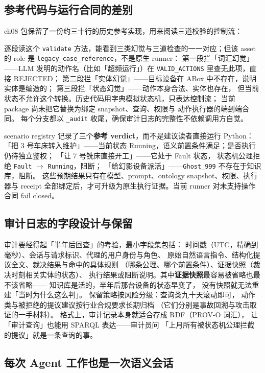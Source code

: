 \subsection{参考代码与运行合同的差别}

ch08 包保留了一份约三十行的历史参考实现，用来阅读三道校验的控制流：



逐段读这个 \texttt{validate} 方法，能看到三类幻觉与三道检查的一一对应；但该 asset
的 role 是 \texttt{legacy\_case\_reference}，不是原生 runner：
第一段拦「词汇幻觉」——LLM 发明的动作名（比如「超频运行」）在
\texttt{VALID\_ACTIONS} 里查无此项，直接 REJECTED；
第二段拦「实体幻觉」——目标设备在 ABox 中不存在，说明实体是编造的；
第三段拦「状态幻觉」——动作本身合法、实体也存在，
但当前状态不允许这个转换。历史代码用字典模拟状态机，只表达控制流；
当前 package 尚未把它替换为绑定 snapshot、查询、权限与
动作执行器的端到端合同。
每个分支都以 \texttt{\_audit} 收尾，确保审计日志的完整性不依赖调用方自觉。

scenario registry 记录了三个\textbf{参考 verdict}，而不是建议读者直接运行 Python：
「把 3 号车床转入维护」——当前状态 Running，语义前置条件满足；是否执行仍待独立鉴权；
「让 7 号铣床直接开工」——它处于 Fault 状态，
状态机公理拒绝 \texttt{Fault} \(\rightarrow\) \texttt{Running}，阻断；
「给幻影设备派活」——\texttt{Ghost\_999} 不存在于知识库，阻断。
这些预期结果只有在模型、prompt、ontology snapshot、权限、执行器与 receipt
全部绑定后，才可升级为原生执行证据。当前 runner 对未支持操作合同 fail closed。

\subsection{审计日志的字段设计与保留}

审计要经得起「半年后回查」的考验，最小字段集包括：
时间戳（UTC，精确到毫秒）、会话与请求标识、代理的用户身份与角色、
原始自然语言指令、结构化提议全文、裁决结果与命中的具体规则
（哪条公理、哪个前置条件）、证据快照（裁决时刻相关实体的状态）、
执行结果或阻断说明。其中\textbf{证据快照}最容易被省略也最不该省略——
知识库是活的，半年后那台设备的状态早变了，
没有快照就无法重建「当时为什么这么判」。
保留策略按风险分级：查询类九十天滚动即可，
动作类与被拒绝的提议建议按行业合规要求长期归档
（它们分别是事故回溯与攻击取证的一手材料）。
格式上，审计记录本身就适合存成 RDF（PROV-O 词汇），
让「审计查询」也能用 SPARQL 表达——审计员问
「上月所有被状态机公理拦截的提议」就是一条查询的事。

\subsection{每次 Agent 工作也是一次语义会话}

